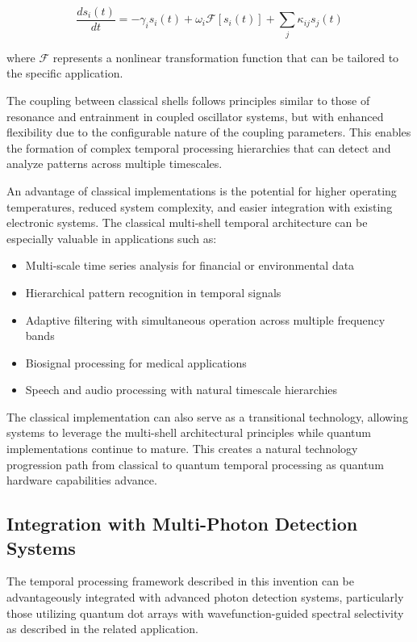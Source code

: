 \documentclass[12pt,letterpaper]{article}
\begin{document}
$$\frac{d s_i(t)}{dt} = -\gamma_i s_i(t) + \omega_i \mathcal{F}[s_i(t)] + \sum_j \kappa_{ij} s_j(t)$$

where $\mathcal{F}$ represents a nonlinear transformation function that can be tailored to the specific application.

The coupling between classical shells follows principles similar to those of resonance and entrainment in coupled oscillator systems, but with enhanced flexibility due to the configurable nature of the coupling parameters. This enables the formation of complex temporal processing hierarchies that can detect and analyze patterns across multiple timescales.

An advantage of classical implementations is the potential for higher operating temperatures, reduced system complexity, and easier integration with existing electronic systems. The classical multi-shell temporal architecture can be especially valuable in applications such as:

\begin{itemize}
    \item Multi-scale time series analysis for financial or environmental data
    \item Hierarchical pattern recognition in temporal signals
    \item Adaptive filtering with simultaneous operation across multiple frequency bands
    \item Biosignal processing for medical applications
    \item Speech and audio processing with natural timescale hierarchies
\end{itemize}

The classical implementation can also serve as a transitional technology, allowing systems to leverage the multi-shell architectural principles while quantum implementations continue to mature. This creates a natural technology progression path from classical to quantum temporal processing as quantum hardware capabilities advance.

\subsection{Integration with Multi-Photon Detection Systems}

The temporal processing framework described in this invention can be advantageously integrated with advanced photon detection systems, particularly those utilizing quantum dot arrays with wavefunction-guided spectral selectivity as described in the related application.
\end{document}
